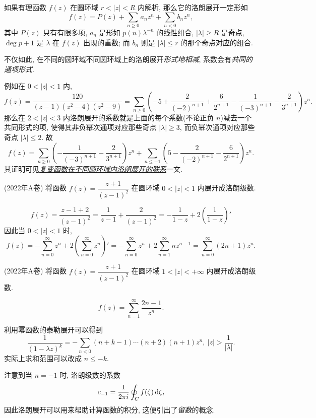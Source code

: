 \documentclass[nocolor,theme=doremi,lang=cn,11pt,chinese,twoside,openright,usesamecnt]{elegantbook}
\begin{document}
如果有理函数 $f(z)$ 在圆环域 $r<|z|<R$ 内解析, 那么它的洛朗展开一定形如
\[f(z)=P(z)+\sum_{n\ge 0}a_n z^n+\sum_{n<0}b_n z^n,\]
其中 $P(z)$ 只有有限多项, 
$a_n$ 是形如 $p(n)\lambda^{-n}$ 的线性组合, $|\lambda|\ge R$ 是奇点, $\deg p+1$ 是 $\lambda$ 在 $f(z)$ 出现的重数; 而 $b_n$ 则是 $|\lambda|\le r$ 的那个奇点对应的组合.

不仅如此, 在不同的圆环域不同圆环域上的洛朗展开{\itshape 形式地相减}, 系数会有\emph{共同的通项形式}.

例如在 $0<|z|<1$ 内,
\[f(z)=\frac{120}{(z-1)(z^2-4)(z^2-9)}=\sum_{n\ge 0}\left(-5+\frac2{(-2)^{n+1}}+\frac6{2^{n+1}}-\frac1{(-3)^{n+1}}-\frac2{3^{n+1}}\right)z^n.\]
那么在 $2<|z|<3$ 内洛朗展开的系数就是上面的每个系数(不论正负 $n$)减去一个共同形式的项, 使得其非负幂次通项对应那些奇点 $|\lambda|\ge 3$, 而负幂次通项对应那些奇点 $|\lambda|\le2$.
故
\[f(z)=\sum_{n\ge 0}\left(-\frac1{(-3)^{n+1}}-\frac2{3^{n+1}}\right)z^n+\sum_{n\le-1}\left(5-\frac2{(-2)^{n+1}}-\frac6{2^{n+1}}\right)z^n.\]
其证明可见\emph{\href{https://zhangshenxing.gitee.io/teaching/publications/袁志杰张神星2023 复变函数在不同圆环域内洛朗展开的联系.pdf}{复变函数在不同圆环域内洛朗展开的联系}}一文.

\begin{example}
	(2022年A卷) 将函数 $f(z)=\dfrac{z+1}{(z-1)^2}$ 在圆环域 $0<|z|<1$ 内展开成洛朗级数.
\end{example}

\begin{solution}
	\[f(z)=\frac{z-1+2}{(z-1)^2}=\frac1{z-1}+\frac{2}{(z-1)^2}=-\frac1{1-z}+2\left(\frac1{1-z}\right)'\]
	{因此当 $0<|z|<1$ 时,
		\[f(z)=-\sum_{n=0}^\infty z^n+2\left(\sum_{n=0}^\infty z^n\right)'=-\sum_{n=0}^\infty z^n+2\sum_{n=1}^\infty nz^{n-1}
		=\sum_{n=0}^\infty(2n+1)z^n.\]}
\end{solution}

\begin{exercise}
	(2022年A卷) 将函数 $f(z)=\dfrac{z+1}{(z-1)^2}$ 在圆环域 $1<|z|<+\infty$ 内展开成洛朗级数.
\end{exercise}

\begin{answer}
	\[f(z)=\sum_{n=1}^\infty \frac{2n-1}{z^n}.\]
\end{answer}
利用幂函数的泰勒展开可以得到
\[\frac1{(1-\lambda z)^k}=-\sum_{n<0}(n+k-1)\cdots(n+2)(n+1)z^n,\ |z|>\frac1{|\lambda|}.\]
实际上求和范围可以改成 $n\le -k$.

注意到当 $n=-1$ 时, 洛朗级数的系数
\[c_{-1}=\frac1{2\pi i}\oint_C f(\zeta)\,\mathrm{d}\zeta,\]
因此洛朗展开可以用来帮助计算函数的积分,
这便引出了\emph{留数}的概念.
\end{document}
